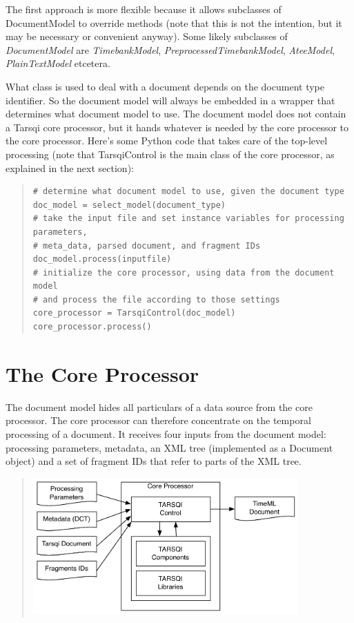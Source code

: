 \documentclass[11pt]{article}
\begin{document}
The first approach is more flexible because it allows subclasses of DocumentModel to override methods (note that this is not the intention, but it may be necessary or convenient anyway). Some likely subclasses of {\em DocumentModel} are {\em TimebankModel}, {\em PreprocessedTimebankModel}, {\em AteeModel}, {\em PlainTextModel} etcetera.

What class is used to deal with a document depends on the document type identifier. So the document model will always be embedded in a wrapper that determines what document model to use. The document model does not contain a Tarsqi core processor, but it hands whatever is needed by the core processor to the core processor. Here's some Python code that takes care of the top-level processing (note that TarsqiControl is the main class of the core processor, as explained in the next section):

\begin{quote}
\begin{verbatim}
# determine what document model to use, given the document type
doc_model = select_model(document_type)
# take the input file and set instance variables for processing parameters, 
# meta_data, parsed document, and fragment IDs
doc_model.process(inputfile)  
# initialize the core processor, using data from the document model
# and process the file according to those settings
core_processor = TarsqiControl(doc_model)
core_processor.process()
\end{verbatim}
\end{quote}




\section{The Core Processor}

The document model hides all particulars of a data source from the core processor. The core processor can therefore concentrate on the temporal processing of a document. It receives four inputs from the document model: processing parameters, metadata, an XML tree (implemented as a Document object) and a set of fragment IDs that refer to parts of the XML tree.

\begin{quote}
\includegraphics[width=4in]{images/architecture3.pdf} 
\end{quote}
\end{document}
